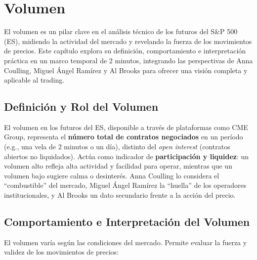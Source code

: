 \chapter{Volumen}  %

El volumen es un pilar clave en el an\'alisis t\'ecnico de los futuros del S\&P 500 (ES), midiendo la actividad del mercado y revelando la fuerza de los movimientos de precios. Este cap\'itulo explora su definici\'on, comportamiento e interpretaci\'on pr\'actica en un marco temporal de 2 minutos, integrando las perspectivas de Anna Coulling, Miguel \'Angel Ram\'irez y Al Brooks para ofrecer una visi\'on completa y aplicable al trading.

\section{Definici\'on y Rol del Volumen}

El volumen en los futuros del ES, disponible a trav\'es de plataformas como CME Group, representa el \textbf{n\'umero total de contratos negociados} en un per\'iodo (e.g., una vela de 2 minutos o un d\'ia), distinto del \textit{open interest} (contratos abiertos no liquidados). Act\'ua como indicador de \textbf{participaci\'on y liquidez}: un volumen alto refleja alta actividad y facilidad para operar, mientras que un volumen bajo sugiere calma o desinter\'es. Anna Coulling lo considera el ``combustible'' del mercado, Miguel \'Angel Ram\'irez la ``huella'' de los operadores institucionales, y Al Brooks un dato secundario frente a la acci\'on del precio.

{\sloppy

\section{Comportamiento e Interpretaci\'on del Volumen}

El volumen var\'ia seg\'un las condiciones del mercado. Permite evaluar la fuerza y validez de los movimientos de precios:

} %

